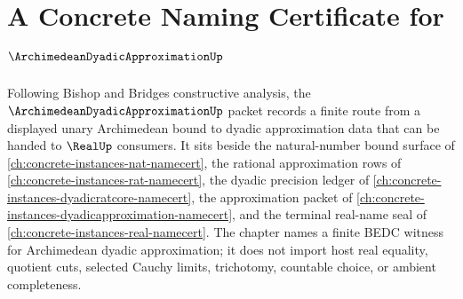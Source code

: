 \chapter{A Concrete Naming Certificate for $\ArchimedeanDyadicApproximationUp$}
\label{ch:concrete-instances-archimedean-dyadic-approximation-namecert}

Following Bishop and Bridges constructive analysis, the $\ArchimedeanDyadicApproximationUp$ packet records a finite route from a displayed unary Archimedean bound to dyadic approximation data that can be handed to $\RealUp$ consumers. It sits beside the natural-number bound surface of \autoref{ch:concrete-instances-nat-namecert}, the rational approximation rows of \autoref{ch:concrete-instances-rat-namecert}, the dyadic precision ledger of \autoref{ch:concrete-instances-dyadicratcore-namecert}, the approximation packet of \autoref{ch:concrete-instances-dyadicapproximation-namecert}, and the terminal real-name seal of \autoref{ch:concrete-instances-real-namecert}. The chapter names a finite BEDC witness for Archimedean dyadic approximation; it does not import host real equality, quotient cuts, selected Cauchy limits, trichotomy, countable choice, or ambient completeness.

